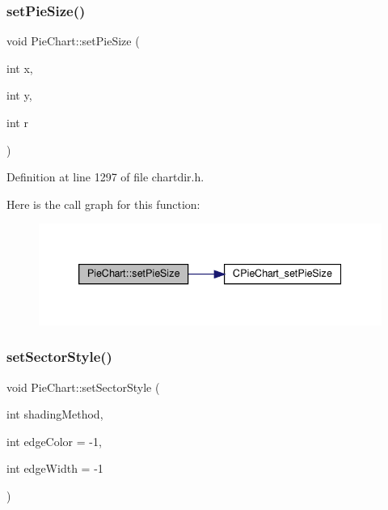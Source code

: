 \subsubsection{\texorpdfstring{set\+Pie\+Size()}{setPieSize()}}
{\footnotesize\ttfamily void Pie\+Chart\+::set\+Pie\+Size (\begin{DoxyParamCaption}\item[{int}]{x,  }\item[{int}]{y,  }\item[{int}]{r }\end{DoxyParamCaption})\hspace{0.3cm}{\ttfamily [inline]}}



Definition at line 1297 of file chartdir.\+h.

Here is the call graph for this function\+:
\nopagebreak
\begin{figure}[H]
\begin{center}
\leavevmode
\includegraphics[width=339pt]{class_pie_chart_a6e1938c8559b2eee0b3a0f97708105fc_cgraph}
\end{center}
\end{figure}
\mbox{\label{class_pie_chart_aafa4b3350c1242f624c99fad5fbb3883}} 
\subsubsection{\texorpdfstring{set\+Sector\+Style()}{setSectorStyle()}}
{\footnotesize\ttfamily void Pie\+Chart\+::set\+Sector\+Style (\begin{DoxyParamCaption}\item[{int}]{shading\+Method,  }\item[{int}]{edge\+Color = {\ttfamily -\/1},  }\item[{int}]{edge\+Width = {\ttfamily -\/1} }\end{DoxyParamCaption})\hspace{0.3cm}{\ttfamily [inline]}}



